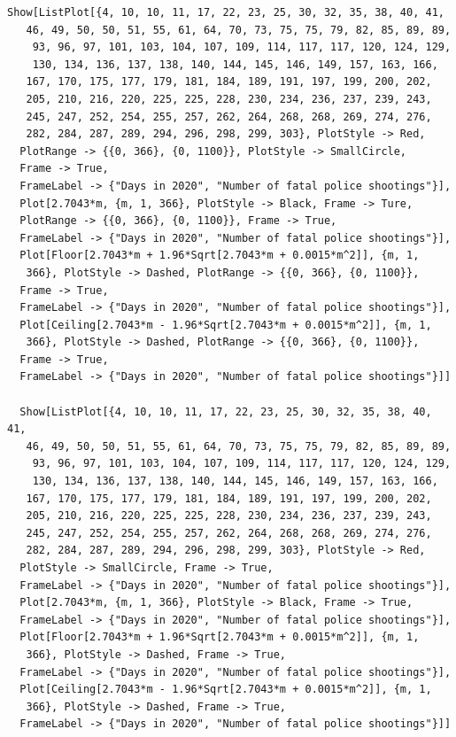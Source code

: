 \documentclass[a4paper]{article}
\begin{document}
\begin{lstlisting}
Show[ListPlot[{4, 10, 10, 11, 17, 22, 23, 25, 30, 32, 35, 38, 40, 41, 
   46, 49, 50, 50, 51, 55, 61, 64, 70, 73, 75, 75, 79, 82, 85, 89, 89,
    93, 96, 97, 101, 103, 104, 107, 109, 114, 117, 117, 120, 124, 129,
    130, 134, 136, 137, 138, 140, 144, 145, 146, 149, 157, 163, 166, 
   167, 170, 175, 177, 179, 181, 184, 189, 191, 197, 199, 200, 202, 
   205, 210, 216, 220, 225, 225, 228, 230, 234, 236, 237, 239, 243, 
   245, 247, 252, 254, 255, 257, 262, 264, 268, 268, 269, 274, 276, 
   282, 284, 287, 289, 294, 296, 298, 299, 303}, PlotStyle -> Red, 
  PlotRange -> {{0, 366}, {0, 1100}}, PlotStyle -> SmallCircle, 
  Frame -> True, 
  FrameLabel -> {"Days in 2020", "Number of fatal police shootings"}],
  Plot[2.7043*m, {m, 1, 366}, PlotStyle -> Black, Frame -> Ture, 
  PlotRange -> {{0, 366}, {0, 1100}}, Frame -> True, 
  FrameLabel -> {"Days in 2020", "Number of fatal police shootings"}],
  Plot[Floor[2.7043*m + 1.96*Sqrt[2.7043*m + 0.0015*m^2]], {m, 1, 
   366}, PlotStyle -> Dashed, PlotRange -> {{0, 366}, {0, 1100}}, 
  Frame -> True, 
  FrameLabel -> {"Days in 2020", "Number of fatal police shootings"}],
  Plot[Ceiling[2.7043*m - 1.96*Sqrt[2.7043*m + 0.0015*m^2]], {m, 1, 
   366}, PlotStyle -> Dashed, PlotRange -> {{0, 366}, {0, 1100}}, 
  Frame -> True, 
  FrameLabel -> {"Days in 2020", "Number of fatal police shootings"}]]
  
  Show[ListPlot[{4, 10, 10, 11, 17, 22, 23, 25, 30, 32, 35, 38, 40, 41, 
   46, 49, 50, 50, 51, 55, 61, 64, 70, 73, 75, 75, 79, 82, 85, 89, 89,
    93, 96, 97, 101, 103, 104, 107, 109, 114, 117, 117, 120, 124, 129,
    130, 134, 136, 137, 138, 140, 144, 145, 146, 149, 157, 163, 166, 
   167, 170, 175, 177, 179, 181, 184, 189, 191, 197, 199, 200, 202, 
   205, 210, 216, 220, 225, 225, 228, 230, 234, 236, 237, 239, 243, 
   245, 247, 252, 254, 255, 257, 262, 264, 268, 268, 269, 274, 276, 
   282, 284, 287, 289, 294, 296, 298, 299, 303}, PlotStyle -> Red, 
  PlotStyle -> SmallCircle, Frame -> True, 
  FrameLabel -> {"Days in 2020", "Number of fatal police shootings"}],
  Plot[2.7043*m, {m, 1, 366}, PlotStyle -> Black, Frame -> True, 
  FrameLabel -> {"Days in 2020", "Number of fatal police shootings"}],
  Plot[Floor[2.7043*m + 1.96*Sqrt[2.7043*m + 0.0015*m^2]], {m, 1, 
   366}, PlotStyle -> Dashed, Frame -> True, 
  FrameLabel -> {"Days in 2020", "Number of fatal police shootings"}],
  Plot[Ceiling[2.7043*m - 1.96*Sqrt[2.7043*m + 0.0015*m^2]], {m, 1, 
   366}, PlotStyle -> Dashed, Frame -> True, 
  FrameLabel -> {"Days in 2020", "Number of fatal police shootings"}]]
\end{lstlisting}
\end{document}
